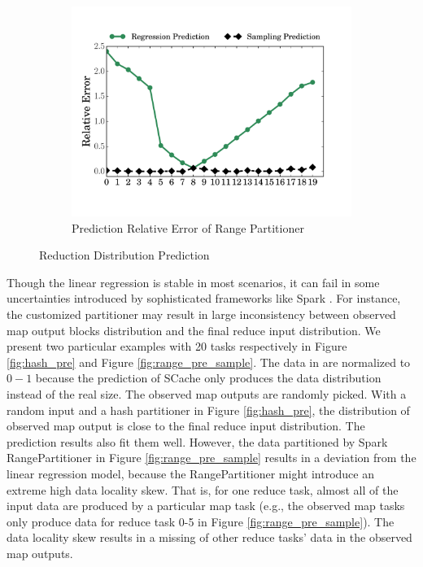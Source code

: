 \begin{figure}
\begin{subfigure}[b]{0.31\linewidth}
		\includegraphics[width=\linewidth]{fig/prediction_relative_error}
		\caption{Prediction Relative Error of Range Partitioner\newline}
		\label{fig:prediction_relative_error}
	\end{subfigure}
	\caption{Reduction Distribution Prediction}
	\label{fig:dis}
	\vspace{-1em}
\end{figure}

Though the linear regression is stable in most scenarios, it can fail in some uncertainties introduced by sophisticated frameworks like Spark \cite{apachespark}.  
For instance, the customized partitioner may result in large inconsistency between observed map output blocks distribution and the final reduce input distribution. 
We present two particular examples with 20 tasks respectively in Figure \ref{fig:hash_pre} and Figure \ref{fig:range_pre_sample}. 
The data in are normalized to $0-1$ because the prediction of SCache only produces the data distribution instead of the real size. 
The observed map outputs are randomly picked. 
With a random input and a hash partitioner in Figure \ref{fig:hash_pre}, the distribution of observed map output is close to the final reduce input distribution. 
The prediction results also fit them well. 
However, the data partitioned by Spark RangePartitioner \cite{apachespark} in Figure \ref{fig:range_pre_sample} results in a deviation from the linear regression model, because the RangePartitioner might introduce an extreme high data locality skew. 
That is, for one reduce task, almost all of the input data are produced by a particular map task (e.g., the observed map tasks only produce data for reduce task 0-5 in Figure \ref{fig:range_pre_sample}).
The data locality skew results in a missing of other reduce tasks' data in the observed map outputs.


